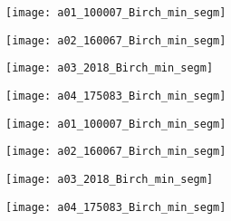 \begin{figure}[!ht]
         
    \begin{subfigure}[t]{\textwidth+20pt\relax}
    	\centering
    	\texttt{[image: a01\_100007\_Birch\_min\_segm]} 
    \end{subfigure}      
    \begin{subfigure}[b]{0.23\textwidth}
    	\centering
        \texttt{[image: a02\_160067\_Birch\_min\_segm]}
    \end{subfigure}
    \begin{subfigure}[b]{0.23\textwidth}
    	\centering
        \texttt{[image: a03\_2018\_Birch\_min\_segm]}
    \end{subfigure}
    \begin{subfigure}[b]{0.23\textwidth}
    	\centering
        \texttt{[image: a04\_175083\_Birch\_min\_segm]}
    \end{subfigure} \vspace{5pt}   
    
    
    \begin{subfigure}[t]{\textwidth+20pt\relax}
    	\centering
    	\texttt{[image: a01\_100007\_Birch\_min\_segm]} 
    \end{subfigure}      
    \begin{subfigure}[b]{0.23\textwidth}
    	\centering
        \texttt{[image: a02\_160067\_Birch\_min\_segm]}
    \end{subfigure}
    \begin{subfigure}[b]{0.23\textwidth}
    	\centering
        \texttt{[image: a03\_2018\_Birch\_min\_segm]}
    \end{subfigure}
    \begin{subfigure}[b]{0.23\textwidth}
    	\centering
        \texttt{[image: a04\_175083\_Birch\_min\_segm]}
    \end{subfigure} \vspace{5pt}
    

\end{figure}
